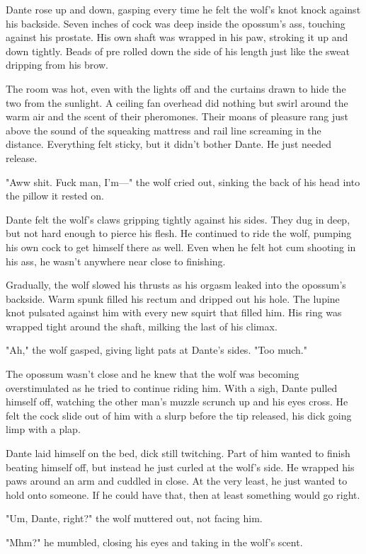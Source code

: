 Dante rose up and down, gasping every time he felt the wolf's knot knock against his backside. Seven inches of cock was deep inside the opossum's ass, touching against his prostate. His own shaft was wrapped in his paw, stroking it up and down tightly. Beads of pre rolled down the side of his length just like the sweat dripping from his brow.

The room was hot, even with the lights off and the curtains drawn to hide the two from the sunlight. A ceiling fan overhead did nothing but swirl around the warm air and the scent of their pheromones. Their moans of pleasure rang just above the sound of the squeaking mattress and rail line screaming in the distance. Everything felt sticky, but it didn't bother Dante. He just needed release.

"Aww shit. Fuck man, I'm---" the wolf cried out, sinking the back of his head into the pillow it rested on.

Dante felt the wolf's claws gripping tightly against his sides. They dug in deep, but not hard enough to pierce his flesh. He continued to ride the wolf, pumping his own cock to get himself there as well. Even when he felt hot cum shooting in his ass, he wasn't anywhere near close to finishing.

Gradually, the wolf slowed his thrusts as his orgasm leaked into the opossum's backside. Warm spunk filled his rectum and dripped out his hole. The lupine knot pulsated against him with every new squirt that filled him. His ring was wrapped tight around the shaft, milking the last of his climax.

"Ah," the wolf gasped, giving light pats at Dante's sides. "Too much."

The opossum wasn't close and he knew that the wolf was becoming overstimulated as he tried to continue riding him. With a sigh, Dante pulled himself off, watching the other man's muzzle scrunch up and his eyes cross. He felt the cock slide out of him with a slurp before the tip released, his dick going limp with a plap.

Dante laid himself on the bed, dick still twitching. Part of him wanted to finish beating himself off, but instead he just curled at the wolf's side. He wrapped his paws around an arm and cuddled in close. At the very least, he just wanted to hold onto someone. If he could have that, then at least something would go right.

"Um, Dante, right?" the wolf muttered out, not facing him.

"Mhm?" he mumbled, closing his eyes and taking in the wolf's scent.

